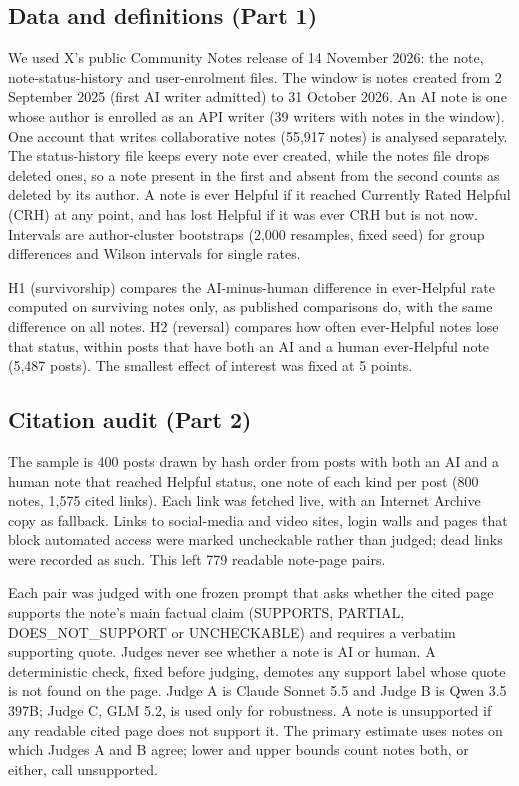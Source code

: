 \documentclass[10.5pt]{article}
\begin{document}
\subsection*{Data and definitions (Part 1)}
We used X's public Community Notes release of 14 November 2026: the note, note-status-history and user-enrolment files. The window is notes created from 2 September 2025 (first AI writer admitted) to 31 October 2026. An AI note is one whose author is enrolled as an API writer (39 writers with notes in the window). One account that writes collaborative notes (55,917 notes) is analysed separately. The status-history file keeps every note ever created, while the notes file drops deleted ones, so a note present in the first and absent from the second counts as deleted by its author. A note is ever Helpful if it reached Currently Rated Helpful (CRH) at any point, and has lost Helpful if it was ever CRH but is not now. Intervals are author-cluster bootstraps (2,000 resamples, fixed seed) for group differences and Wilson intervals for single rates.

H1 (survivorship) compares the AI-minus-human difference in ever-Helpful rate computed on surviving notes only, as published comparisons do, with the same difference on all notes. H2 (reversal) compares how often ever-Helpful notes lose that status, within posts that have both an AI and a human ever-Helpful note (5,487 posts). The smallest effect of interest was fixed at 5 points.

\subsection*{Citation audit (Part 2)}
The sample is 400 posts drawn by hash order from posts with both an AI and a human note that reached Helpful status, one note of each kind per post (800 notes, 1,575 cited links). Each link was fetched live, with an Internet Archive copy as fallback. Links to social-media and video sites, login walls and pages that block automated access were marked uncheckable rather than judged; dead links were recorded as such. This left 779 readable note-page pairs.

Each pair was judged with one frozen prompt that asks whether the cited page supports the note's main factual claim (SUPPORTS, PARTIAL, DOES\_NOT\_SUPPORT or UNCHECKABLE) and requires a verbatim supporting quote. Judges never see whether a note is AI or human. A deterministic check, fixed before judging, demotes any support label whose quote is not found on the page. Judge A is Claude Sonnet 5.5 and Judge B is Qwen 3.5 397B; Judge C, GLM 5.2, is used only for robustness. A note is unsupported if any readable cited page does not support it. The primary estimate uses notes on which Judges A and B agree; lower and upper bounds count notes both, or either, call unsupported.
\end{document}
